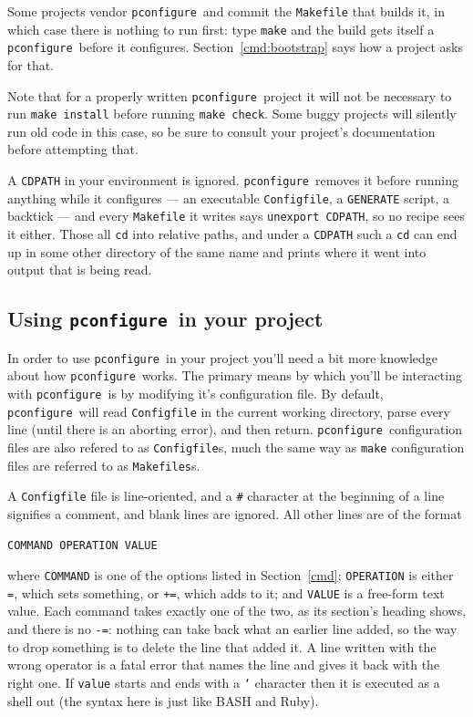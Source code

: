 \documentclass{article}
\newcommand{\pconfigure}{\texttt{pconfigure}}
\begin{document}
Some projects vendor \pconfigure\ and commit the \texttt{Makefile}
that builds it, in which case there is nothing to run first: type
\texttt{make} and the build gets itself a \pconfigure\ before it
configures.  Section~\ref{cmd:bootstrap} says how a project asks for
that.

Note that for a properly written \pconfigure\ project it will not be
necessary to run \texttt{make install} before running \texttt{make
  check}.  Some buggy projects will silently run old code in this
case, so be sure to consult your project's documentation before
attempting that.

A \texttt{CDPATH} in your environment is ignored.  \pconfigure\
removes it before running anything while it configures --- an
executable \texttt{Configfile}, a \texttt{GENERATE} script, a
backtick --- and every \texttt{Makefile} it writes says
\texttt{unexport CDPATH}, so no recipe sees it either.  Those all
\texttt{cd} into relative paths, and under a \texttt{CDPATH} such a
\texttt{cd} can end up in some other directory of the same name and
prints where it went into output that is being read.

\subsection{Using \pconfigure\ in your project}

In order to use \pconfigure\ in your project you'll need a bit more
knowledge about how \pconfigure\ works.  The primary means by which
you'll be interacting with \pconfigure\ is by modifying it's
configuration file.  By default, \pconfigure\ will read
\texttt{Configfile} in the current working directory, parse every line
(until there is an aborting error), and then return.
\pconfigure\ configuration files are also refered to as
\texttt{Configfile}s, much the same way as \texttt{make} configuration
files are referred to as \texttt{Makefiles}s.

A \texttt{Configfile} file is line-oriented, and a \texttt{\#}
character at the beginning of a line signifies a comment, and blank
lines are ignored.  All other lines are of the format
\begin{verbatim}
COMMAND OPERATION VALUE
\end{verbatim}
where \texttt{COMMAND} is one of the options listed in
Section~\ref{cmd}; \texttt{OPERATION} is either \texttt{=}, which
sets something, or \texttt{+=}, which adds to it; and \texttt{VALUE}
is a free-form text value.  Each command takes exactly one of the two,
as its section's heading shows, and there is no \texttt{-=}: nothing
can take back what an earlier line added, so the way to drop something
is to delete the line that added it.  A line written with the wrong
operator is a fatal error that names the line and gives it back with
the right one.  If \texttt{value} starts and ends with a \texttt{`} character
then it is executed as a shell out (the syntax here is just like BASH
and Ruby).
\end{document}
